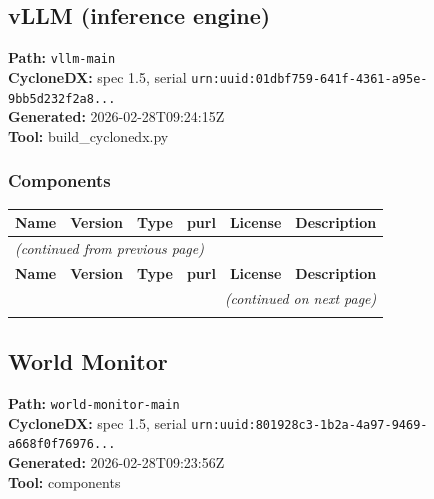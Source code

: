 \documentclass[11pt,a4paper]{article}
\begin{document}
\subsection{vLLM (inference engine)}
\textbf{Path:} \texttt{vllm-main}
\\ \textbf{CycloneDX:} spec 1.5, serial \texttt{urn:uuid:01dbf759-641f-4361-a95e-9bb5d232f2a8...}
\\ \textbf{Generated:} 2026-02-28T09:24:15Z
\\ \textbf{Tool:} build\_cyclonedx.py

\subsubsection*{Components}
\begin{longtable}{|p{4cm}|p{2cm}|p{1.6cm}|p{5cm}|p{1.5cm}|p{3.5cm}|}
\toprule
\rowcolor{sbomhdr}\textbf{Name} & \textbf{Version} & \textbf{Type} & \textbf{purl} & \textbf{License} & \textbf{Description} \\
\midrule
\endfirsthead
\multicolumn{6}{l}{\small\itshape (continued from previous page)} \\
\toprule
\rowcolor{sbomhdr}\textbf{Name} & \textbf{Version} & \textbf{Type} & \textbf{purl} & \textbf{License} & \textbf{Description} \\
\midrule
\endhead
\midrule
\multicolumn{6}{r}{\small\itshape (continued on next page)} \\
\endfoot
\bottomrule
\endlastfoot
\end{longtable}

\subsection{World Monitor}
\textbf{Path:} \texttt{world-monitor-main}
\\ \textbf{CycloneDX:} spec 1.5, serial \texttt{urn:uuid:801928c3-1b2a-4a97-9469-a668f0f76976...}
\\ \textbf{Generated:} 2026-02-28T09:23:56Z
\\ \textbf{Tool:} components
\end{document}
